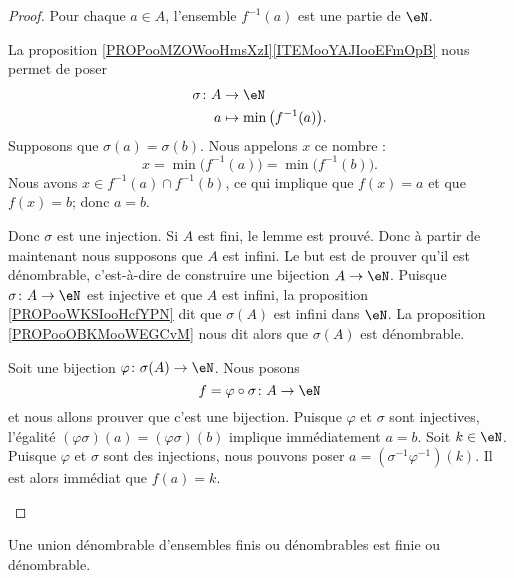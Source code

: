 \begin{proof}
	Pour chaque \( a\in A\), l'ensemble \( f^{-1}(a)\) est une partie de \( \eN\).
	\begin{subproof}
		La proposition \ref{PROPooMZOWooHmsXzI}\ref{ITEMooYAJIooEFmOpB} nous permet de poser
		\begin{equation}
			\begin{aligned}
				\sigma\colon A & \to \eN                            \\
				a              & \mapsto \min\big( f^{-1}(a) \big).
			\end{aligned}
		\end{equation}
		Supposons que \( \sigma(a)=\sigma(b)\). Nous appelons \( x\) ce nombre :
		\begin{equation}
			x=\min\big( f^{-1}(a) \big)=\min\big( f^{-1}(b) \big).
		\end{equation}
		Nous avons \( x\in f^{-1}(a)\cap f^{-1}(b)\), ce qui implique que \( f(x)=a\) et que \( f(x)=b\); donc \( a=b\).

		Donc \( \sigma\) est une injection.
		Si \( A\) est fini, le lemme est prouvé. Donc à partir de maintenant nous supposons que \( A\) est infini. Le but est de prouver qu'il est dénombrable, c'est-à-dire de construire une bijection \( A\to \eN\).
		Puisque \( \sigma\colon A\to  \eN\) est injective et que \( A\) est infini, la proposition \ref{PROPooWKSIooHcfYPN} dit que \( \sigma(A)\) est infini dans \( \eN\). La proposition \ref{PROPooOBKMooWEGCvM} nous dit alors que \( \sigma(A)\) est dénombrable.

		Soit une bijection \( \varphi\colon \sigma(A)\to \eN\).
		Nous posons
		\begin{equation}
			f=\varphi\circ \sigma\colon A\to \eN
		\end{equation}
		et nous allons prouver que c'est une bijection.
		\spitem[Injective]
		Puisque \( \varphi\) et \( \sigma\) sont injectives, l'égalité \( (\varphi\sigma)(a)=(\varphi\sigma)(b)\) implique immédiatement \( a=b\).
		\spitem[Surjective]
		Soit \( k\in \eN\). Puisque \( \varphi\) et \( \sigma\) sont des injections, nous pouvons poser \( a=(\sigma^{-1}\varphi^{-1})(k)\). Il est alors immédiat que \( f(a)=k\).
	\end{subproof}
\end{proof}

\begin{proposition}     \label{PROPooENTPooSPpmhY}
	Une union dénombrable d'ensembles finis ou dénombrables est finie ou dénombrable.
\end{proposition}

